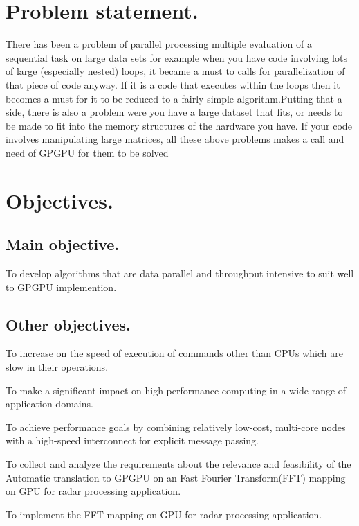 \documentclass{article}
\begin{document}
\section{Problem statement.}
{There has been a problem of parallel processing multiple evaluation of a sequential task on large
data sets for example when you have code involving lots of large (especially nested) loops, it became
a must to calls for parallelization of that piece of code anyway. If it is a code that executes within
the loops then it becomes a must for it to be reduced to a fairly simple algorithm.Putting that a
side, there is also a problem were you have a large dataset that fits, or needs to be made to fit into
the memory structures of the hardware you have. If your code involves manipulating large matrices,
all these above problems makes a call and need of GPGPU for them to be solved}

\section{Objectives.}

\subsection{Main objective.}
{To develop algorithms that are data parallel and throughput intensive to suit well to GPGPU implemention.}

\subsection{Other objectives.}
{To increase on the speed of execution of commands other than CPUs which are slow in their operations.

To make a significant impact on high-performance computing in a wide range of application domains.

To achieve performance goals by combining relatively low-cost, multi-core nodes with a high-speed interconnect for explicit message passing.

To collect and analyze the requirements about the relevance and feasibility of the Automatic translation
to GPGPU on an Fast Fourier Transform(FFT)  mapping on GPU for radar processing application.

To implement the FFT mapping on GPU for radar processing application.
}
\end{document}
